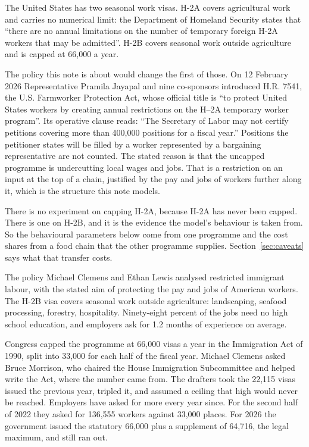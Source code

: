 \documentclass[11pt,a4paper]{article}
\begin{document}
The United States has two seasonal work visas. H-2A covers agricultural work and carries no numerical limit: the Department of Homeland Security states that ``there are no annual limitations on the number of temporary foreign H-2A workers that may be admitted''. H-2B covers seasonal work outside agriculture and is capped at 66,000 a year.

The policy this note is about would change the first of those. On 12 February 2026 Representative Pramila Jayapal and nine co-sponsors introduced H.R. 7541, the U.S. Farmworker Protection Act, whose official title is ``to protect United States workers by creating annual restrictions on the H--2A temporary worker program''. Its operative clause reads: ``The Secretary of Labor may not certify petitions covering more than 400,000 positions for a fiscal year.'' Positions the petitioner states will be filled by a worker represented by a bargaining representative are not counted. The stated reason is that the uncapped programme is undercutting local wages and jobs. That is a restriction on an input at the top of a chain, justified by the pay and jobs of workers further along it, which is the structure this note models.

There is no experiment on capping H-2A, because H-2A has never been capped. There is one on H-2B, and it is the evidence the model's behaviour is taken from. So the behavioural parameters below come from one programme and the cost shares from a food chain that the other programme supplies. Section~\ref{sec:caveats} says what that transfer costs.

The policy Michael Clemens and Ethan Lewis analysed restricted immigrant labour, with the stated aim of protecting the pay
and jobs of American workers. The H-2B visa covers seasonal work outside agriculture: landscaping, seafood processing, forestry, hospitality. Ninety-eight percent of the jobs need no high school education, and employers ask for 1.2 months of experience on average.

Congress capped the programme at 66,000 visas a year in the Immigration Act of 1990, split into 33,000 for each half of the fiscal year. Michael Clemens asked Bruce Morrison, who chaired the House Immigration Subcommittee and helped write the Act, where the number came from. The drafters took the 22,115 visas issued the previous year, tripled it, and assumed a ceiling that high would never be reached. Employers have asked for more every year since. For the second half of 2022 they asked for 136,555 workers against 33,000 places. For 2026 the government issued the statutory 66,000 plus a supplement of 64,716, the legal maximum, and still ran out.
\end{document}

